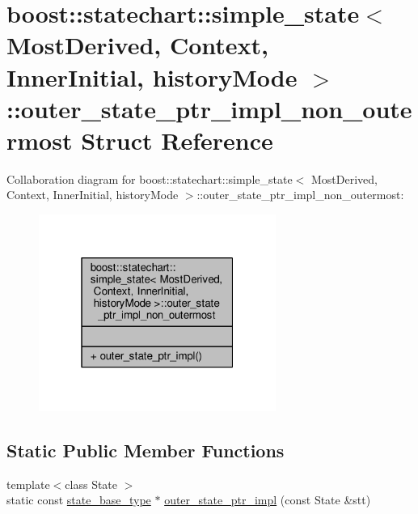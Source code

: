 \hypertarget{structboost_1_1statechart_1_1simple__state_1_1outer__state__ptr__impl__non__outermost}{}\section{boost\+:\+:statechart\+:\+:simple\+\_\+state$<$ Most\+Derived, Context, Inner\+Initial, history\+Mode $>$\+:\+:outer\+\_\+state\+\_\+ptr\+\_\+impl\+\_\+non\+\_\+outermost Struct Reference}
\label{structboost_1_1statechart_1_1simple__state_1_1outer__state__ptr__impl__non__outermost}


Collaboration diagram for boost\+:\+:statechart\+:\+:simple\+\_\+state$<$ Most\+Derived, Context, Inner\+Initial, history\+Mode $>$\+:\+:outer\+\_\+state\+\_\+ptr\+\_\+impl\+\_\+non\+\_\+outermost\+:
\nopagebreak
\begin{figure}[H]
\begin{center}
\leavevmode
\includegraphics[width=220pt]{structboost_1_1statechart_1_1simple__state_1_1outer__state__ptr__impl__non__outermost__coll__graph}
\end{center}
\end{figure}
\subsection*{Static Public Member Functions}
\begin{DoxyCompactItemize}
\item 
{\footnotesize template$<$class State $>$ }\\static const \mbox{\hyperlink{classboost_1_1statechart_1_1simple__state_ae4af81f8eae996cc418efa3387af0ef6}{state\+\_\+base\+\_\+type}} $\ast$ \mbox{\hyperlink{structboost_1_1statechart_1_1simple__state_1_1outer__state__ptr__impl__non__outermost_a86506e098d4882c19b5a15b560f672d5}{outer\+\_\+state\+\_\+ptr\+\_\+impl}} (const State \&stt)
\end{DoxyCompactItemize}


